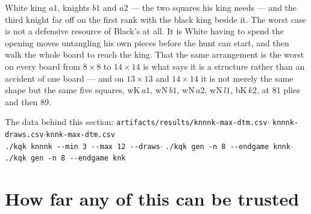 \documentclass[11pt]{article}
\begin{document}
\noindent
White king $a1$, knights $b1$ and $a2$ --- the two squares his king needs --- and
the third knight far off on the first rank with the black king beside it. The
worst case is not a defensive resource of Black's at all. It is White having to
spend the opening moves untangling his own pieces before the hunt can start,
and then walk the whole board to reach the king. That the same arrangement is
the worst on every board from $8\times8$ to $14\times14$ is what says it is a
structure rather than an accident of one board --- and on $13\times13$ and
$14\times14$ it is not merely the same shape but the same five squares,
wK\,$a1$, wN\,$b1$, wN\,$a2$, wN\,$l1$, bK\,$k2$, at 81 plies and then 89.

\begin{center}\small\color{inksoft}
The data behind this section:\quad
\texttt{artifacts/results/knnnk-max-dtm.csv}\quad$\cdot$\quad
\texttt{knnnk-draws.csv}\quad$\cdot$\quad\texttt{knnk-max-dtm.csv}\\
\texttt{./kqk knnnk -{}-min 3 -{}-max 12 -{}-draws}\quad$\cdot$\quad
\texttt{./kqk gen -n 8 -{}-endgame knnk}\quad$\cdot$\quad
\texttt{./kqk gen -n 8 -{}-endgame knk}
\end{center}

\section{How far any of this can be trusted}\label{sec:trust}
\end{document}
